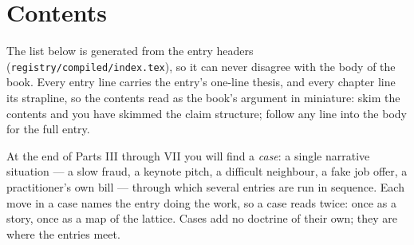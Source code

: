 \chapter*{Contents}
\begin{partblurb}
The list below is generated from the entry headers
(\texttt{registry/compiled/index.tex}), so it can never disagree with the
body of the book. Every entry line carries the entry's one-line thesis,
and every chapter line its strapline, so the contents read as the book's
argument in miniature: skim the contents and you have skimmed the claim
structure; follow any line into the body for the full entry.

At the end of Parts III through VII you will find a \emph{case}: a single
narrative situation --- a slow fraud, a keynote pitch, a difficult
neighbour, a fake job offer, a practitioner's own bill --- through which
several entries are run in sequence. Each move in a case names the entry
doing the work, so a case reads twice: once as a story, once as a map of
the lattice. Cases add no doctrine of their own; they are where the
entries meet.
\end{partblurb}
